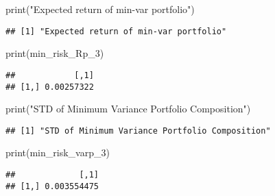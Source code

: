 \documentclass[
]{article}
\newenvironment{Shaded}{\begin{snugshade}}{\end{snugshade}}
\newcommand{\FunctionTok}[1]{\textcolor[rgb]{0.00,0.00,0.00}{#1}}
\newcommand{\NormalTok}[1]{#1}
\newcommand{\StringTok}[1]{\textcolor[rgb]{0.31,0.60,0.02}{#1}}
\begin{document}
\begin{Shaded}
\begin{Highlighting}[]
\FunctionTok{print}\NormalTok{(}\StringTok{"Expected return of min{-}var portfolio"}\NormalTok{)}
\end{Highlighting}
\end{Shaded}

\begin{verbatim}
## [1] "Expected return of min-var portfolio"
\end{verbatim}

\begin{Shaded}
\begin{Highlighting}[]
\FunctionTok{print}\NormalTok{(min\_risk\_Rp\_3)}
\end{Highlighting}
\end{Shaded}

\begin{verbatim}
##            [,1]
## [1,] 0.00257322
\end{verbatim}

\begin{Shaded}
\begin{Highlighting}[]
\FunctionTok{print}\NormalTok{(}\StringTok{"STD of Minimum Variance Portfolio Composition"}\NormalTok{)}
\end{Highlighting}
\end{Shaded}

\begin{verbatim}
## [1] "STD of Minimum Variance Portfolio Composition"
\end{verbatim}

\begin{Shaded}
\begin{Highlighting}[]
\FunctionTok{print}\NormalTok{(min\_risk\_varp\_3)}
\end{Highlighting}
\end{Shaded}

\begin{verbatim}
##             [,1]
## [1,] 0.003554475
\end{verbatim}
\end{document}

